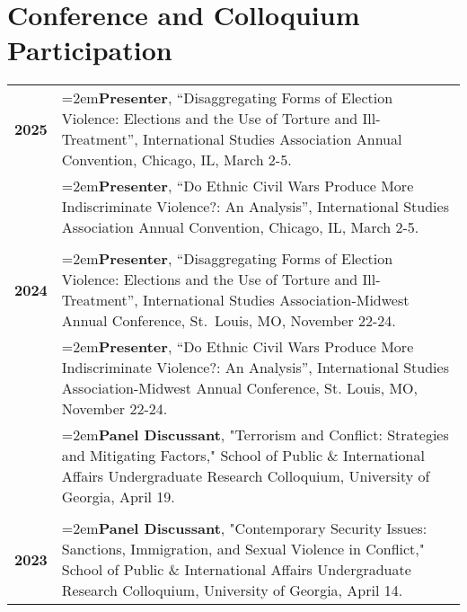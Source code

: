 \documentclass[letterpaper,12pt]{article}
\begin{document}
\section{Conference and Colloquium Participation}
\begin{xltabular}{\dimexpr\textwidth-0in}{p{.85in}X}
\textbf{2025} & \hangindent=2em\textbf{Presenter}, ``Disaggregating Forms of Election Violence: Elections and the Use of Torture and Ill-Treatment”, International Studies Association Annual Convention, Chicago, IL, March 2-5.\\
                     & \hangindent=2em\textbf{Presenter}, ``Do Ethnic Civil Wars Produce More Indiscriminate Violence?: An Analysis”, International Studies Association Annual Convention, Chicago, IL, March 2-5.\\ \\
\textbf{2024} & \hangindent=2em\textbf{Presenter}, ``Disaggregating Forms of Election Violence: Elections and the Use of \mbox{Torture} and Ill-Treatment”, International Studies Association-Midwest Annual Conference, \mbox{St. Louis}, MO, November 22-24.\\
                     & \hangindent=2em\textbf{Presenter}, ``Do Ethnic Civil Wars Produce More Indiscriminate Violence?: An \mbox{Analysis}”, International Studies Association-Midwest Annual Conference, St. Louis, MO, \mbox{November} 22-24.\\
                     & \hangindent=2em\textbf{Panel Discussant}, "Terrorism and Conflict: Strategies and Mitigating Factors," School of Public \& International Affairs Undergraduate Research Colloquium, University of Georgia, April 19.\\  \\
\textbf{2023} &  \hangindent=2em\textbf{Panel Discussant}, "Contemporary Security Issues: Sanctions, Immigration, and \mbox{Sexual} \mbox{Violence} in Conflict," School of Public \& International Affairs Undergraduate \mbox{Research} \mbox{Colloquium,} University of Georgia, April 14.\\ 
\end{xltabular}

\end{document}
